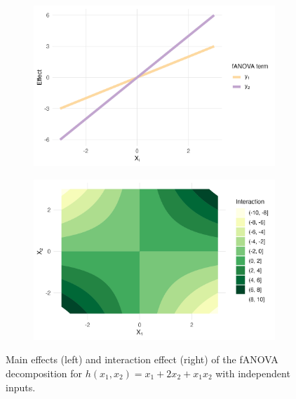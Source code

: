 \begin{figure}[htpb]
    \centering
    \begin{subfigure}[t]{0.49\textwidth}
        \centering
        \includegraphics[width=\textwidth]{images/experiment_section/running_example_a1p10_a2p20_a11p00_a22p00_a12p10_rhop00_main.png}
    \end{subfigure}%
    \hfill
    \begin{subfigure}[t]{0.49\textwidth}
        \centering
        \includegraphics[width=\textwidth]{images/experiment_section/running_example_a1p10_a2p20_a11p00_a22p00_a12p10_rhop00_interaction.png}
    \end{subfigure}
    \caption{Main effects (left) and interaction effect (right) of the fANOVA decomposition for $h(x_1, x_2) = x_1 + 2 x_2 + x_1 x_2$ with independent inputs.}
    \label{fig:running_ex_independent}
\end{figure}

